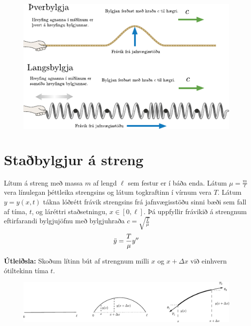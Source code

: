 \begin{figure}[H]
    \centering
    \includegraphics{figures/langs-thver.pdf}
\end{figure}

\section{Staðbylgjur á streng} 

\begin{tcolorbox}
\begin{theorem}
Lítum á streng með massa $m$ af lengd $\ell$ sem festur er í báða enda. Látum $\mu = \frac{m}{\ell}$ vera línulegan þéttleika strengsins og látum togkraftinn í vírnum vera $T$. Látum $y = y(x,t)$ tákna lóðrétt frávik strengsins frá jafnvægisstöðu sinni bæði sem fall af tíma, $t$, og láréttri staðsetningu, $x \in [0,\ell]$. Þá uppfyllir frávikið á strengnum eftirfarandi bylgjujöfnu með bylgjuhraða $c = \sqrt{\frac{T}{\mu}}$
\begin{align*}
    \Ddot{y} = \frac{T}{\mu} y''
\end{align*}
\end{theorem}
\end{tcolorbox}


\textbf{Útleiðsla:} Skoðum lítinn bút af strengnum milli $x$ og $x + \Delta x$ við einhvern ótiltekinn tíma $t$.

\begin{figure}[H]
    \centering
    \vspace{-0.4cm}
    \includegraphics[scale = 0.9]{figures/strengur-deriv.pdf}
    \label{fig:standing-waves}
\end{figure}

